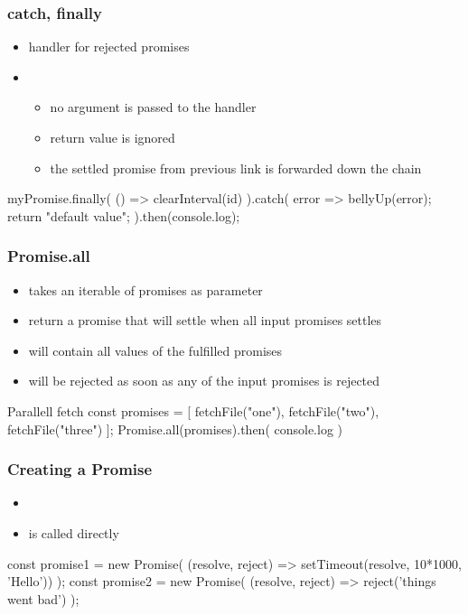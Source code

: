 \begin{frame}[fragile] \frametitle{catch, finally}
\begin{itemize}
  \item {} handler for rejected promises
  \item {}
  \begin{itemize}
    \item no argument is passed to the handler
    \item return value is ignored
    \item the settled promise from previous link is forwarded down the chain
  \end{itemize}
\end{itemize}
\begin{CodeBox}{}
myPromise.finally(
  () => clearInterval(id)
).catch(
 error => {
   bellyUp(error);
   return "default value";
 }
).then(console.log);
\end{CodeBox}
\end{frame}

\begin{frame}[fragile] \frametitle{Promise.all}
\begin{itemize}
  \item takes an iterable of promises as parameter 
  \item return a promise that will settle when all input promises settles
  \item will contain all values of the fulfilled promises
  \item will be rejected as soon as any of the input promises is rejected
\end{itemize}
\vspace{5mm}
\begin{CodeBox}{Parallell fetch}
const promises = [
  fetchFile("one"),
  fetchFile("two"),
  fetchFile("three")
];
Promise.all(promises).then(
  console.log
)
\end{CodeBox}
\end{frame}

\begin{frame}[fragile] \frametitle{Creating a Promise}
\begin{itemize}
  \item {}
  \item {} is called directly
\end{itemize}
\vspace{10mm}
\begin{CodeBox}{}
const promise1 = new Promise(
  (resolve, reject) => setTimeout(resolve, 10*1000, 'Hello'))
);
const promise2 = new Promise(
  (resolve, reject) => reject('things went bad')
);
\end{CodeBox}
\end{frame}

